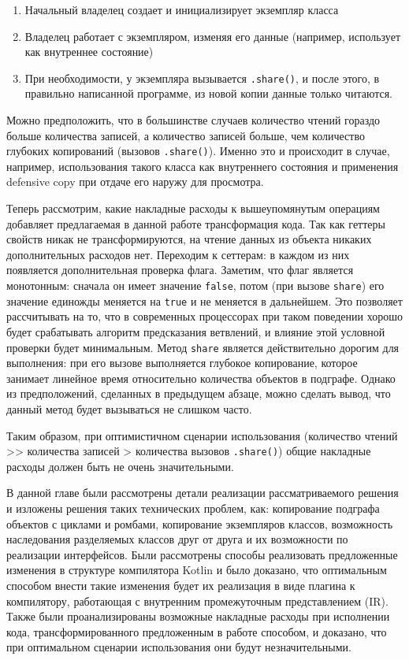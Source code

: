 \documentclass[specification,annotation,times]{itmo-student-thesis}
\begin{document}
\begin{enumerate}
	\item Начальный владелец создает и инициализирует экземпляр класса
	\item Владелец работает с экземпляром, изменяя его данные (например, использует как внутреннее состояние)
	\item При необходимости, у экземпляра вызывается \texttt{.share()}, и после этого, в правильно написанной программе, из новой копии данные только читаются.
\end{enumerate}


Можно предположить, что в большинстве случаев количество чтений гораздо больше количества записей, а количество записей больше, чем количество глубоких копирований (вызовов \texttt{.share()}).
Именно это и происходит в случае, например, использования такого класса как внутреннего состояния и применения defensive copy при отдаче его наружу для просмотра.

Теперь рассмотрим, какие накладные расходы к вышеупомянутым операциям добавляет предлагаемая в данной работе трансформация кода.
Так как геттеры свойств никак не трансформируются, на чтение данных из объекта никаких дополнительных расходов нет.
Переходим к сеттерам: в каждом из них появляется дополнительная проверка флага. Заметим, что флаг является монотонным: сначала он имеет значение \texttt{false}, потом (при вызове \texttt{share}) его значение единожды меняется на \texttt{true} и не меняется в дальнейшем.
Это позволяет рассчитывать на то, что в современных процессорах при таком поведении хорошо будет срабатывать алгоритм предсказания ветвлений, и влияние этой условной проверки будет минимальным.
Метод \texttt{share} является действительно дорогим для выполнения: при его вызове выполняется глубокое копирование, которое занимает линейное время относительно количества объектов в подграфе. Однако из предположений, сделанных в предыдущем абзаце, можно сделать вывод, что данный метод будет вызываться не слишком часто.

Таким образом, при оптимистичном сценарии использования (количество чтений >{}> количества записей > количества вызовов \texttt{.share()})
общие накладные расходы должен быть не очень значительными.


\chapterconclusion

В данной главе были рассмотрены детали реализации рассматриваемого решения и изложены решения таких технических проблем, как: копирование подграфа объектов с циклами и ромбами, копирование экземпляров классов, возможность наследования разделяемых классов друг от друга и их возможности по реализации интерфейсов.
Были рассмотрены способы реализовать предложенные изменения в структуре компилятора Kotlin и было доказано, что оптимальным способом внести такие изменения будет их реализация в виде плагина к компилятору, работающая с внутренним промежуточным представлением (IR).
Также были проанализированы возможные накладные расходы при исполнении кода, трансформированного предложенным в работе способом, и доказано, что при оптимальном сценарии использования они будут незначительными.  
\end{document}
